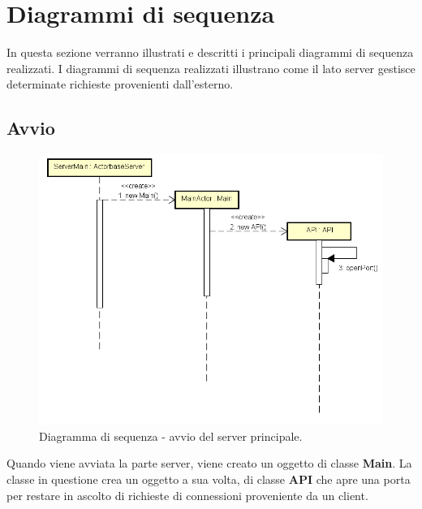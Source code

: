 \documentclass[a4paper]{article}
\begin{document}
                
	\newpage 
	\section{Diagrammi di sequenza}
        In questa sezione verranno illustrati e descritti i principali diagrammi di sequenza realizzati. I diagrammi di sequenza realizzati illustrano come il lato server gestisce determinate
       richieste provenienti dall'esterno.
       
       \subsection{Avvio}
            \begin{figure} [H]
				\centering
				\includegraphics[width=\textwidth]{ST/seq/AvvioMain.png}
				\caption{Diagramma di sequenza - avvio del server principale.}
			\end{figure}
            Quando viene avviata la parte server, viene creato un oggetto di classe \textbf{Main}. La classe in questione crea un oggetto a sua volta, di classe \textbf{API} che apre una porta
             per restare in ascolto di richieste di connessioni proveniente da un client.
             
\end{document}
